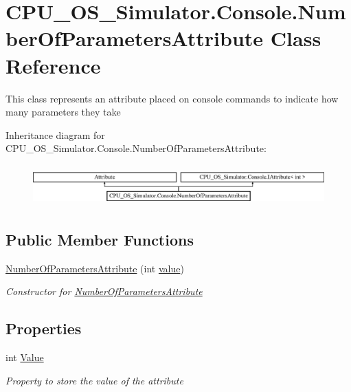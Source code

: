 \hypertarget{class_c_p_u___o_s___simulator_1_1_console_1_1_number_of_parameters_attribute}{}\section{C\+P\+U\+\_\+\+O\+S\+\_\+\+Simulator.\+Console.\+Number\+Of\+Parameters\+Attribute Class Reference}
\label{class_c_p_u___o_s___simulator_1_1_console_1_1_number_of_parameters_attribute}


This class represents an attribute placed on console commands to indicate how many parameters they take  


Inheritance diagram for C\+P\+U\+\_\+\+O\+S\+\_\+\+Simulator.\+Console.\+Number\+Of\+Parameters\+Attribute\+:\begin{figure}[H]
\begin{center}
\leavevmode
\includegraphics[height=1.590909cm]{class_c_p_u___o_s___simulator_1_1_console_1_1_number_of_parameters_attribute}
\end{center}
\end{figure}
\subsection*{Public Member Functions}
\begin{DoxyCompactItemize}
\item 
\hyperlink{class_c_p_u___o_s___simulator_1_1_console_1_1_number_of_parameters_attribute_a41059bf368ee101feb1a32c7468ebc2f}{Number\+Of\+Parameters\+Attribute} (int \hyperlink{class_c_p_u___o_s___simulator_1_1_console_1_1_number_of_parameters_attribute_a74f66203060602ef8135280692dc2064}{value})
\begin{DoxyCompactList}\small\item\em Constructor for \hyperlink{class_c_p_u___o_s___simulator_1_1_console_1_1_number_of_parameters_attribute}{Number\+Of\+Parameters\+Attribute} \end{DoxyCompactList}\end{DoxyCompactItemize}
\subsection*{Properties}
\begin{DoxyCompactItemize}
\item 
int \hyperlink{class_c_p_u___o_s___simulator_1_1_console_1_1_number_of_parameters_attribute_a7e083af44b45e3e68868d0d5d1991000}{Value}
\begin{DoxyCompactList}\small\item\em Property to store the value of the attribute \end{DoxyCompactList}\end{DoxyCompactItemize}
